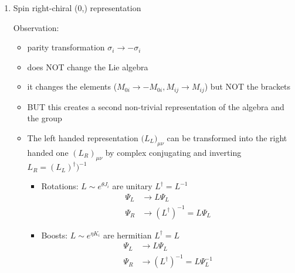 \documentclass[../main.tex]{subfiles}
\begin{document}
\begin{itemize}
\begin{enumerate}
\item Spin  right-chiral (0,) representation

Observation: 
\begin{itemize}
\item parity transformation $\sigma_i\rightarrow-\sigma_i$ 
\item does NOT change the Lie algebra 
\item it changes the elements ($M_{0i}\rightarrow-M_{0i}, M_{ij}\rightarrow M_{ij}$) but NOT the brackets 
\item BUT this creates a second non-trivial representation of the algebra and the group
\item The left handed representation ${(L_L})_{\mu\nu}$ can be transformed into the right handed one ${(L_R)}_{\mu\nu}$ by complex conjugating and inverting $L_R=(L_L)^\dagger)^{-1}$
\begin{itemize}
\item Rotations: $L\sim e^{\theta J_i}$ are unitary $L^\dagger=L^{-1}$
\begin{align}
\Psi_{L}&\rightarrow L \Psi_L\\
\Psi_{R}&\rightarrow (L^\dagger)^{-1}=L \Psi_L
\end{align}
\item Boosts: $L\sim e^{\eta K_i}$ are hermitian $L^\dagger=L$
\begin{align}
\Psi_{L}&\rightarrow L \Psi_L\\
\Psi_{R}&\rightarrow (L^\dagger)^{-1}=L \Psi_L^{-1}
\end{align}
\end{itemize}




\end{itemize}
\end{enumerate}
\end{itemize}
\end{document}
